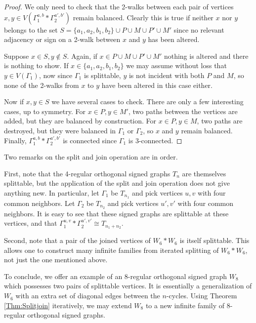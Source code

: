 \documentclass[11pt]{article}
\theoremstyle{plain}
\theoremstyle{definition}
\begin{document}
\begin{proof}
We only need to check that the 2-walks between each pair of vertices $x,y\in V(\Gamma_1^{a,b}*\Gamma_2^{a',b'})$ remain balanced. Clearly this is true if neither $x$ nor $y$ belongs to the set $S=\{a_1,a_2,b_1,b_2\}\cup P\cup M\cup P'\cup M'$ since no relevant adjacency or sign on a 2-walk between $x$ and $y$ has been altered.
 

Suppose $x\in S,y\notin S$. Again, if $x\in  P\cup M\cup P'\cup M'$ nothing is altered and there is nothing to show. If $x\in \{a_1,a_2,b_1,b_2\}$ we may assume without loss that $y\in V(\Gamma_1)$, now since $\Gamma_1$ is splittable, $y$ is not incident with both $P$ and $M$, so none of the 2-walks from $x$ to $y$ have been altered in this case either. 

Now if $x,y\in S$ we have several cases to check. There are only a few interesting cases, up to symmetry. For $x\in P,y\in M'$, two paths between the vertices are added, but they are balanced by construction. For $x\in P,y\in M$, two paths are destroyed, but they were balanced in $\Gamma_1$ or $\Gamma_2$, so $x$ and $y$ remain balanced. Finally, $\Gamma_1^{a,b}*\Gamma_2^{a',b'}$ is connected since $\Gamma_1$ is $3$-connected.
\end{proof}

Two remarks on the split and join operation are in order. 

First, note that the 4-regular orthogonal signed graphs $T_n$ are themselves splittable, but the application of the split and join operation does not give anything new. In particular, let $\Gamma_1$ be $T_{n_1}$ and pick vertices $u,v$ with four common neighbors. Let $\Gamma_2$ be $T_{n_2}$ and pick vertices $u',v'$ with four common neighbors. It is easy to see that these signed graphs are splittable at these vertices, and that $\Gamma_1^{u,v}*\Gamma_2^{u',v'}\cong T_{n_1+n_2}$.

Second, note that a pair of the joined vertices of $W_6*W_6$ is itself splittable. This allows one to construct many infinite families from iterated splitting of $W_6*W_6$, not just the one mentioned above. 

To conclude, we offer an example of an 8-regular orthogonal signed graph $W_8$ which possesses two pairs of splittable vertices. It is essentially a generalization of $W_6$ with an extra set of diagonal edges between the $n$-cycles. 
Using Theorem \ref{Thm:Splitjoin} iteratively, we may extend $W_8$ to a new infinite family of $8$-regular orthogonal signed graphs.
\end{document}
